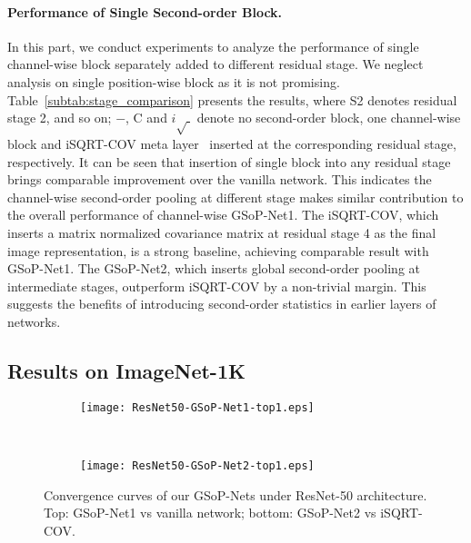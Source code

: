 \documentclass[10pt,twocolumn,letterpaper]{article}
\begin{document}
\vspace{-8pt}\paragraph{Performance of Single Second-order Block.}

In this part, we conduct experiments to analyze the performance of single channel-wise block separately  added to different residual stage. We neglect analysis on single position-wise block as it is not promising. Table~\ref{subtab:stage_comparison} presents the results, where S2 denotes residual stage 2, and so on; $-$,  C and $i\sqrt{\;}$ denote no second-order block, one channel-wise block and iSQRT-COV meta layer~\cite{Li_2017_ICCV} inserted at the corresponding residual stage, respectively. It can be seen that  insertion of single block into any residual stage brings comparable improvement over the vanilla  network. This indicates the channel-wise second-order pooling at different stage makes similar contribution to the overall performance of channel-wise GSoP-Net1. The iSQRT-COV, which inserts a matrix normalized covariance matrix at residual stage 4 as the final image representation, is a strong baseline, achieving comparable result with GSoP-Net1. The GSoP-Net2, which inserts  global second-order pooling at intermediate stages, outperform iSQRT-COV by a non-trivial margin. This suggests the benefits of introducing second-order statistics in earlier layers of networks.  




\subsection{Results  on ImageNet-1K}\label{subsection:imagenet-1k}


\begin{figure}[t]
	\setlength\tabcolsep{4pt}
	\footnotesize
	\centering
	\begin{subfigure}[t]{0.7\linewidth}
		\centering
		\texttt{[image: ResNet50-GSoP-Net1-top1.eps]}
	\end{subfigure}
	\\
	\begin{subfigure}[t]{0.7\linewidth}
		\centering
		\texttt{[image: ResNet50-GSoP-Net2-top1.eps]}
	\end{subfigure}
	\caption{Convergence curves of our GSoP-Nets under ResNet-50 architecture. Top: GSoP-Net1 vs vanilla network; bottom: GSoP-Net2 vs iSQRT-COV.}
	\label{figure:curve}
\end{figure}
\end{document}
